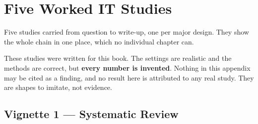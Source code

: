 \chapter{Five Worked IT Studies}\label{app:vignettes}

Five studies carried from question to write-up, one per major design. They show
the whole chain in one place, which no individual chapter can.

\begin{alertbox}
These studies were written for this book. The settings are realistic and the
methods are correct, but \textbf{every number is invented}. Nothing in this
appendix may be cited as a finding, and no result here is attributed to any
real study. They are shapes to imitate, not evidence.
\end{alertbox}

\section{Vignette 1 --- Systematic Review}

